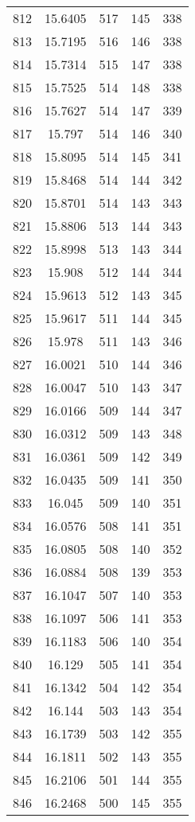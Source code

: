 \documentclass[12pt,a4paper]{article}
\begin{document}
\begin{tabular}{r|cccc}
	812 & 15.6405 & 517 & 145 & 338 \\
	813 & 15.7195 & 516 & 146 & 338 \\
	814 & 15.7314 & 515 & 147 & 338 \\
	815 & 15.7525 & 514 & 148 & 338 \\
	816 & 15.7627 & 514 & 147 & 339 \\
	817 & 15.797 & 514 & 146 & 340 \\
	818 & 15.8095 & 514 & 145 & 341 \\
	819 & 15.8468 & 514 & 144 & 342 \\
	820 & 15.8701 & 514 & 143 & 343 \\
	821 & 15.8806 & 513 & 144 & 343 \\
	822 & 15.8998 & 513 & 143 & 344 \\
	823 & 15.908 & 512 & 144 & 344 \\
	824 & 15.9613 & 512 & 143 & 345 \\
	825 & 15.9617 & 511 & 144 & 345 \\
	826 & 15.978 & 511 & 143 & 346 \\
	827 & 16.0021 & 510 & 144 & 346 \\
	828 & 16.0047 & 510 & 143 & 347 \\
	829 & 16.0166 & 509 & 144 & 347 \\
	830 & 16.0312 & 509 & 143 & 348 \\
	831 & 16.0361 & 509 & 142 & 349 \\
	832 & 16.0435 & 509 & 141 & 350 \\
	833 & 16.045 & 509 & 140 & 351 \\
	834 & 16.0576 & 508 & 141 & 351 \\
	835 & 16.0805 & 508 & 140 & 352 \\
	836 & 16.0884 & 508 & 139 & 353 \\
	837 & 16.1047 & 507 & 140 & 353 \\
	838 & 16.1097 & 506 & 141 & 353 \\
	839 & 16.1183 & 506 & 140 & 354 \\
	840 & 16.129 & 505 & 141 & 354 \\
	841 & 16.1342 & 504 & 142 & 354 \\
	842 & 16.144 & 503 & 143 & 354 \\
	843 & 16.1739 & 503 & 142 & 355 \\
	844 & 16.1811 & 502 & 143 & 355 \\
	845 & 16.2106 & 501 & 144 & 355 \\
	846 & 16.2468 & 500 & 145 & 355 \\

\end{tabular}
\end{document}
